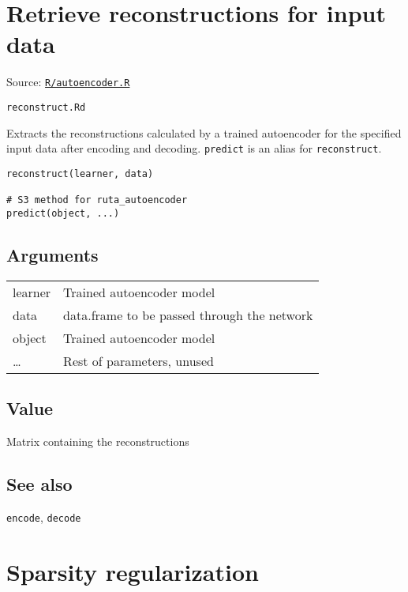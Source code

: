 \section{Retrieve reconstructions for input
data}\label{retrieve-reconstructions-for-input-data}

Source:
\href{https://github.com/fdavidcl/ruta/blob/master/R/autoencoder.R}{\texttt{R/autoencoder.R}}

\texttt{reconstruct.Rd}

Extracts the reconstructions calculated by a trained autoencoder for the
specified input data after encoding and decoding. \texttt{predict} is an
alias for \texttt{reconstruct}.

\begin{verbatim}
reconstruct(learner, data)

# S3 method for ruta_autoencoder
predict(object, ...)
\end{verbatim}

\hypertarget{arguments}{\subsection{\texorpdfstring{\protect\hyperlink{arguments}{}Arguments}{Arguments}}\label{arguments}}

\begin{longtable}[c]{@{}>{\small}p{3cm}>{\raggedright}p{12.5cm}@{}}
\toprule
learner & Trained autoencoder model\tabularnewline
data & data.frame to be passed through the network\tabularnewline
object & Trained autoencoder model\tabularnewline
\ldots{} & Rest of parameters, unused\tabularnewline
\bottomrule
\end{longtable}

\hypertarget{value}{\subsection{\texorpdfstring{\protect\hyperlink{value}{}Value}{Value}}\label{value}}

Matrix containing the reconstructions

\hypertarget{see-also}{\subsection{\texorpdfstring{\protect\hyperlink{see-also}{}See
also}{See also}}\label{see-also}}

\texttt{encode}, \texttt{decode}

\section{Sparsity regularization}\label{sparsity-regularization}

